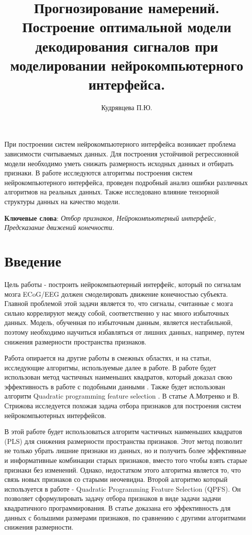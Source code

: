 \documentclass[12pt,twoside]{article}
\title
    {Прогнозирование намерений. Построение оптимальной модели декодирования сигналов при моделировании нейрокомпьютерного интерфейса.}
\author {Кудрявцева П.Ю.} %
\begin{document}
\maketitle

\abstract
    {При построении систем нейрокомпьютерного интерфейса возникает проблема зависимости считываемых данных. Для построения устойчивой регрессионной модели необходимо уметь снижать размерность исходных данных и отбирать признаки. В работе исследуются алгоритмы построения систем нейрокомпьютерного интерфейса, проведен подробный анализ ошибки различных алгоритмов на реальных данных. Также исследовано влияние тензорной структуры данных на качество модели.

\bigskip
\textbf{Ключевые слова}: \emph {Отбор признаков, Нейрокомпьютерный интерфейс, Предсказание движений конечности}.}

\section{Введение}
 Цель работы - построить нейрокомпьютерный интерфейс, который по сигналам мозга ECoG/EEG должен смоделировать движение конечностью субъекта. Главной проблемой этой задачи является то, что сигналы, считанные с мозга сильно коррелируют между собой, соответственно у нас много избыточных данных. Модель, обученная по избыточным данным, является нестабильной, поэтому необходимо научиться избавляться от лишних данных, например, путем снижения размерности пространства признаков. 
 
 Работа опирается на другие работы в смежных областях, и на статьи, исследующие алгоритмы, используемые далее в работе. В работе будет использован метод частичных наименьших квадратов, который доказал свою эффективность в работе с подобными данными \cite{pls_effective}. Также будет использован алгоритм Quadratic programming feature selection \cite{qpfc}. В статье А.Мотренко и В. Стрижова \cite{motrenko} исследуется похожая задача отбора признаков для построения систем нейрокомпьютерных интерфейсов. 
 
 В этой работе будет использоваться алгоритм частичных наименьших квадратов (PLS) для снижения размерности пространства признаков. Этот метод позволит не только убрать лишние признаки из данных, но и получить более эффективные и информативные комбинации старых признаков, вместо того чтобы взять старые признаки без изменений. Однако, недостатком этого алгоритма является то, что связь новых признаков со старыми неочевидна. Второй алгоритмо который используется в работе - Quadratic Programming Feature Selection (QPFS). Он позволяет сформулировать задачу отбора признаков в виде задачи задачи квадратичного программирования. В статье \cite{qpfc} доказана его эффективность для данных с большими размерами признаков, по сравнению с другими алгоритмами снижения размерности.

{}

\end{document}
